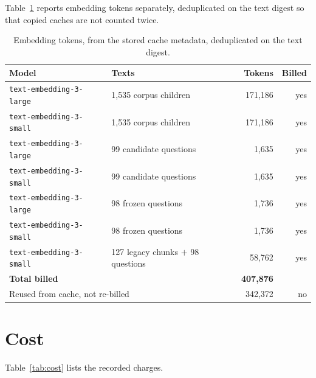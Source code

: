 Table~\ref{tab:usage-embeddings} reports embedding tokens separately, deduplicated on the text digest so that copied caches are not counted twice.

\begin{table}[htbp]
  \centering
  \caption{Embedding tokens, from the stored cache metadata, deduplicated on the text digest.}
  \label{tab:usage-embeddings}
  \small
  \begin{tabular}{llrr}
    \toprule
    \textbf{Model} & \textbf{Texts} & \textbf{Tokens} & \textbf{Billed} \\
    \midrule
    \texttt{text-embedding-3-large} & 1{,}535 corpus children & 171{,}186 & yes \\
    \texttt{text-embedding-3-small} & 1{,}535 corpus children & 171{,}186 & yes \\
    \texttt{text-embedding-3-large} & 99 candidate questions & 1{,}635 & yes \\
    \texttt{text-embedding-3-small} & 99 candidate questions & 1{,}635 & yes \\
    \texttt{text-embedding-3-large} & 98 frozen questions & 1{,}736 & yes \\
    \texttt{text-embedding-3-small} & 98 frozen questions & 1{,}736 & yes \\
    \texttt{text-embedding-3-small} & 127 legacy chunks $+$ 98 questions & 58{,}762 & yes \\
    \midrule
    \multicolumn{2}{l}{\textbf{Total billed}} & \textbf{407{,}876} & \\
    \multicolumn{2}{l}{Reused from cache, not re-billed} & 342{,}372 & no \\
    \bottomrule
  \end{tabular}
\end{table}

\section{Cost}

Table~\ref{tab:cost} lists the recorded charges.

